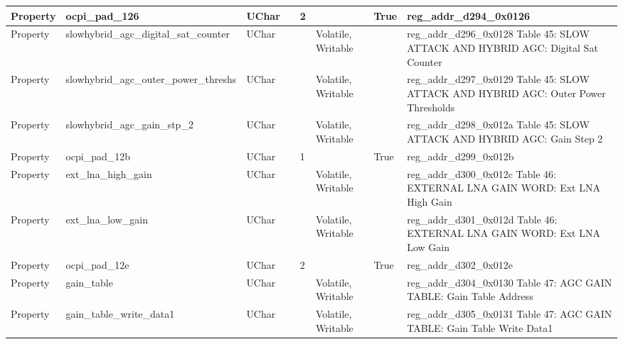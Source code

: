 \documentclass{article}
\begin{document}
\begin{scriptsize}
\begin{longtable}{|p{2cm}|p{5cm}|p{1cm}|p{2cm}|p{2cm}|p{1.75cm}|p{1.5cm}|p{5.1cm}|}
  \hline
  Property & ocpi\_pad\_126                                           & UChar &                  & 2                &                     & True    & reg\_addr\_d294\_0x0126 \\
  \hline
  Property & slowhybrid\_agc\_digital\_sat\_counter                   & UChar &                  &                  & Volatile,  Writable &         & reg\_addr\_d296\_0x0128 Table 45: SLOW ATTACK AND HYBRID AGC: Digital Sat Counter \\
  \hline
  Property & slowhybrid\_agc\_outer\_power\_threshs                   & UChar &                  &                  & Volatile,  Writable &         & reg\_addr\_d297\_0x0129 Table 45: SLOW ATTACK AND HYBRID AGC: Outer Power Thresholds \\
  \hline
  Property & slowhybrid\_agc\_gain\_stp\_2                            & UChar &                  &                  & Volatile,  Writable &         & reg\_addr\_d298\_0x012a Table 45: SLOW ATTACK AND HYBRID AGC: Gain Step 2 \\
  \hline
  Property & ocpi\_pad\_12b                                           & UChar &                  & 1                &                     & True    & reg\_addr\_d299\_0x012b \\
  \hline
  Property & ext\_lna\_high\_gain                                     & UChar &                  &                  & Volatile,  Writable &         & reg\_addr\_d300\_0x012c Table 46: EXTERNAL LNA GAIN WORD: Ext LNA High Gain \\
  \hline
  Property & ext\_lna\_low\_gain                                      & UChar &                  &                  & Volatile,  Writable &         & reg\_addr\_d301\_0x012d Table 46: EXTERNAL LNA GAIN WORD: Ext LNA Low Gain \\
  \hline
  Property & ocpi\_pad\_12e                                           & UChar &                  & 2                &                     & True    & reg\_addr\_d302\_0x012e \\
  \hline
  Property & gain\_table                                              & UChar &                  &                  & Volatile,  Writable &         & reg\_addr\_d304\_0x0130 Table 47: AGC GAIN TABLE: Gain Table Address \\
  \hline
  Property & gain\_table\_write\_data1                                & UChar &                  &                  & Volatile,  Writable &         & reg\_addr\_d305\_0x0131 Table 47: AGC GAIN TABLE: Gain Table Write Data1 \\

\end{longtable}
\end{scriptsize}
\end{document}
